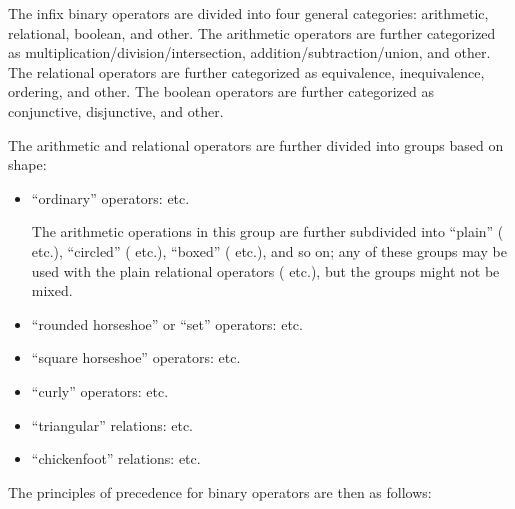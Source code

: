 The infix binary operators are divided into four general categories: arithmetic,
relational, boolean, and other.  The arithmetic operators are further categorized as
multiplication/division/intersection, addition/subtraction/union, and other.
The relational operators are further categorized as equivalence,
inequivalence, ordering, and other.
The boolean operators
are further categorized as conjunctive, disjunctive, and other.

The arithmetic and relational operators are further divided into groups based on shape:
\begin{itemize}
\item ``ordinary'' operators:
\EXP{+ - \cdot \times / \pm \mp \oplus \ominus
\odot \otimes \oslash
\boxplus \boxminus \boxdot \boxtimes < \leq \geq > \ll \lll \ggg \gg
\nless \nleq \ngeq \ngtr} etc.

The arithmetic operations in this group are further subdivided into
``plain'' (\EXP{+ - \cdot \times / \pm \mp} etc.),
``circled'' (\EXP{\oplus \ominus \odot \otimes \oslash} etc.),
``boxed'' (\EXP{\boxplus \boxminus \boxdot \boxtimes} etc.), and so on;
 any of these groups may be used with
the plain relational operators
(\EXP{< \leq \geq > \ll \lll \ggg \gg \nless \nleq \ngeq \ngtr} etc.),
but the groups might not be mixed.

\item ``rounded horseshoe'' or ``set'' operators:
\EXP{\cap \Cap \cup \Cup \uplus \subset \subseteq \supseteq \supset
\Subset \Supset \not\subset \nsubseteq \nsupseteq \not\supset}  etc.

\item ``square horseshoe'' operators:
\EXP{\sqcap \sqcup \sqsubset \sqsubseteq \sqsupseteq \sqsupset
\not\sqsubseteq \not\sqsupseteq} etc.

\item ``curly'' operators:
\EXP{\curlywedge \curlyvee \prec \preceq \succeq \succ
\nprec \not\preccurlyeq \not\succcurlyeq \nsucc} etc.

\item ``triangular'' relations:
\EXP{\lhd \unlhd \unrhd \rhd
\ntriangleleft \ntrianglelefteq \ntrianglerighteq \ntriangleright} etc.

\item ``chickenfoot'' relations: \EXP{<\!\llap{-} \rlap{-}\!>} etc.
\end{itemize}
The principles of precedence for binary operators are then as follows:

